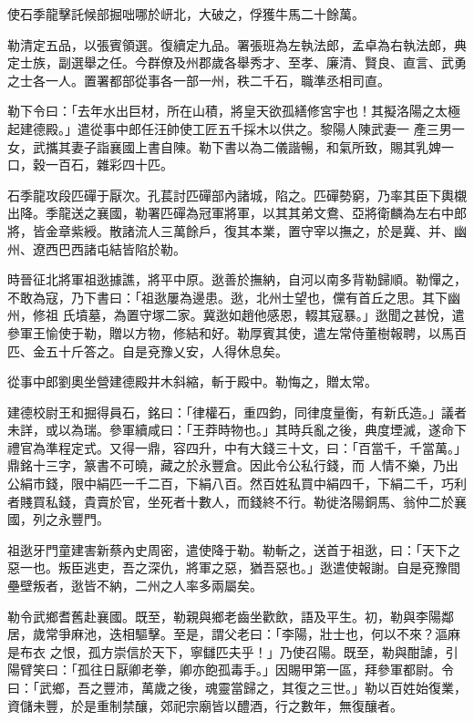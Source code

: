 \begin{pinyinscope}
 使石季龍擊託候部掘咄哪於岍北，大破之，俘獲牛馬二十餘萬。



 勒清定五品，以張賓領選。復續定九品。署張班為左執法郎，孟卓為右執法郎，典定士族，副選舉之任。今群僚及州郡歲各舉秀才、至孝、廉清、賢良、直言、武勇之士各一人。置署都部從事各一部一州，秩二千石，職準丞相司直。



 勒下令曰：「去年水出巨材，所在山積，將皇天欲孤繕修宮宇也！其擬洛陽之太極起建德殿。」遣從事中郎任汪帥使工匠五千採木以供之。黎陽人陳武妻一
 產三男一女，武攜其妻子詣襄國上書自陳。勒下書以為二儀諧暢，和氣所致，賜其乳婢一口，穀一百石，雜彩四十匹。



 石季龍攻段匹磾于厭次。孔萇討匹磾部內諸城，陷之。匹磾勢窮，乃率其臣下輿櫬出降。季龍送之襄國，勒署匹磾為冠軍將軍，以其其弟文鴦、亞將衛麟為左右中郎將，皆金章紫綬。散諸流人三萬餘戶，復其本業，置守宰以撫之，於是冀、并、幽州、遼西巴西諸屯結皆陷於勒。



 時晉征北將軍祖逖據譙，將平中原。逖善於撫納，自河以南多背勒歸順。勒憚之，不敢為寇，乃下書曰：「祖逖屢為邊患。逖，北州士望也，儻有首丘之思。其下幽州，修祖
 氏墳墓，為置守塚二家。冀逖如趙他感恩，輟其寇暴。」逖聞之甚悅，遣參軍王愉使于勒，贈以方物，修結和好。勒厚賓其使，遣左常侍董樹報聘，以馬百匹、金五十斤答之。自是兗豫乂安，人得休息矣。



 從事中郎劉奧坐營建德殿井木斜縮，斬于殿中。勒悔之，贈太常。



 建德校尉王和掘得員石，銘曰：「律權石，重四鈞，同律度量衡，有新氏造。」議者未詳，或以為瑞。參軍續咸曰：「王莽時物也。」其時兵亂之後，典度堙滅，遂命下禮官為準程定式。又得一鼎，容四升，中有大錢三十文，曰：「百當千，千當萬。」鼎銘十三字，篆書不可曉，藏之於永豐倉。因此令公私行錢，而
 人情不樂，乃出公絹市錢，限中絹匹一千二百，下絹八百。然百姓私買中絹四千，下絹二千，巧利者賤買私錢，貴賣於官，坐死者十數人，而錢終不行。勒徙洛陽銅馬、翁仲二於襄國，列之永豐門。



 祖逖牙門童建害新蔡內史周密，遣使降于勒。勒斬之，送首于祖逖，曰：「天下之惡一也。叛臣逃吏，吾之深仇，將軍之惡，猶吾惡也。」逖遣使報謝。自是兗豫間壘壁叛者，逖皆不納，二州之人率多兩屬矣。



 勒令武鄉耆舊赴襄國。既至，勒親與鄉老齒坐歡飲，語及平生。初，勒與李陽鄰居，歲常爭麻池，迭相驅擊。至是，謂父老曰：「李陽，壯士也，何以不來？漚麻是布衣
 之恨，孤方崇信於天下，寧讎匹夫乎！」乃使召陽。既至，勒與酣謔，引陽臂笑曰：「孤往日厭卿老拳，卿亦飽孤毒手。」因賜甲第一區，拜參軍都尉。令曰：「武鄉，吾之豐沛，萬歲之後，魂靈當歸之，其復之三世。」勒以百姓始復業，資儲未豐，於是重制禁釀，郊祀宗廟皆以醴酒，行之數年，無復釀者。




\end{pinyinscope}
